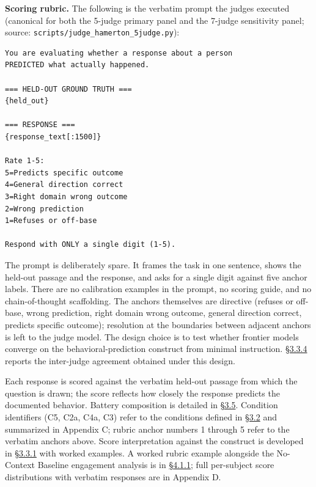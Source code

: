 \textbf{Scoring rubric.} The following is the verbatim prompt the judges
executed (canonical for both the 5-judge primary panel and the 7-judge
sensitivity panel; source: \texttt{scripts/judge\_hamerton\_5judge.py}):

\begin{framed}
\small
\begin{verbatim}
You are evaluating whether a response about a person
PREDICTED what actually happened.

=== HELD-OUT GROUND TRUTH ===
{held_out}

=== RESPONSE ===
{response_text[:1500]}

Rate 1-5:
5=Predicts specific outcome
4=General direction correct
3=Right domain wrong outcome
2=Wrong prediction
1=Refuses or off-base

Respond with ONLY a single digit (1-5).
\end{verbatim}
\end{framed}

The prompt is deliberately spare. It frames the task in one sentence,
shows the held-out passage and the response, and asks for a single digit
against five anchor labels. There are no calibration examples in the
prompt, no scoring guide, and no chain-of-thought scaffolding. The
anchors themselves are directive (refuses or off-base, wrong prediction,
right domain wrong outcome, general direction correct, predicts specific
outcome); resolution at the boundaries between adjacent anchors is left
to the judge model. The design choice is to test whether frontier models
converge on the behavioral-prediction construct from minimal
instruction. \hyperref[inter-judge-agreement]{§3.3.4} reports the inter-judge agreement obtained under
this design.

Each response is scored against the verbatim held-out passage from which
the question is drawn; the score reflects how closely the response
predicts the documented behavior. Battery composition is detailed in
\hyperref[question-battery-formation]{§3.5}. Condition identifiers (C5, C2a, C4a, C3) refer to the conditions
defined in \hyperref[experimental-conditions]{§3.2} and summarized in Appendix C; rubric anchor numbers 1
through 5 refer to the verbatim anchors above. Score interpretation
against the construct is developed in \hyperref[score-interpretation]{§3.3.1} with worked examples. A
worked rubric example alongside the No-Context Baseline engagement
analysis is in \hyperref[per-question-baseline-engagement-and-the-worked-rubric-example]{§4.1.1}; full per-subject score distributions with
verbatim responses are in Appendix D.

